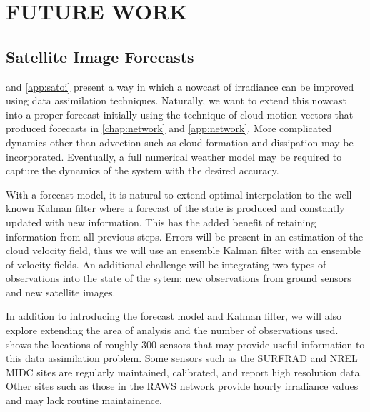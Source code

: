 \chapter{FUTURE WORK}
\label{chap:satfx}
\label{chap:future_work}



\section{Satellite Image Forecasts}
\label{sec:satellite_fx}

 and \cref{app:satoi} present a way in which a
nowcast of irradiance can be improved using data assimilation
techniques.
Naturally, we want to extend this nowcast into a proper forecast
initially using the technique of cloud motion vectors that produced
forecasts in \cref{chap:network} and \cref{app:network}.
More complicated dynamics other than advection such as cloud formation
and dissipation may be incorporated.
Eventually, a full numerical weather model may be required to capture
the dynamics of the system with the desired accuracy.


With a forecast model, it is natural to extend optimal interpolation
to the well known Kalman filter where a forecast of the state is
produced and constantly updated with new information.
This has the added benefit of retaining information from all previous
steps.
Errors will be present in an estimation of the cloud velocity field,
thus we will use an ensemble Kalman filter with an ensemble of
velocity fields.
An additional challenge will be integrating two types of observations
into the state of the sytem: new observations from ground sensors and
new satellite images.


In addition to introducing the forecast model and Kalman filter, we
will also explore extending the area of analysis and the number of
observations used.
 shows the locations of roughly 300 sensors that
may provide useful information to this data assimilation problem.
Some sensors such as the SURFRAD and NREL MIDC sites are regularly
maintained, calibrated, and report high resolution data.
Other sites such as those in the RAWS network provide hourly
irradiance values and may lack routine maintainence.

